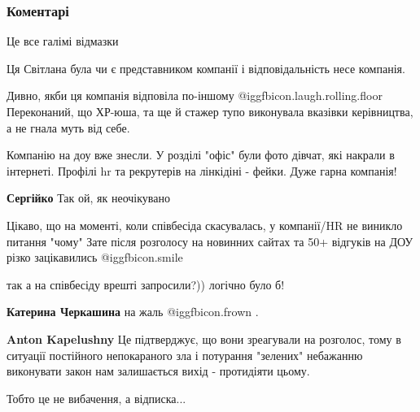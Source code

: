  
 
 
 
 
\subsubsection{Коментарі}
\label{sec:21_10_2021.fb.kapeljushnyj_anton.1.izvinenie_svetlana.cmt}

\begin{itemize} %
Це все галімі відмазки

Ця Світлана була чи є представником компанії і відповідальність несе компанія.

Дивно, якби ця компанія відповіла по-іншому  @igg{fbicon.laugh.rolling.floor}  Переконаний, що ХР-юша, та ще й стажер тупо виконувала вказівки керівництва, а не гнала муть від себе.

Компанію на доу вже знесли. У розділі "офіс" були фото дівчат, які накрали в інтернеті. Профілі hr та рекрутерів на лінкідіні - фейки.
Дуже гарна компанія!

\begin{itemize} %
\textbf{Сергійко} Так ой, як неочікувано
\end{itemize} %

Цікаво, що на моменті, коли співбесіда скасувалась, у компанії/HR не виникло питання "чому"
Зате після розголосу на новинних сайтах та 50+ відгуків на ДОУ різко зацікавились  @igg{fbicon.smile} 

так а на співбесіду врешті запросили?)) логічно було б!

\begin{itemize} %
\textbf{Катерина Черкашина} на жаль  @igg{fbicon.frown} .

\textbf{Anton Kapelushny} Це підтверджує, що вони зреагували на розголос, тому в ситуації постійного непокараного зла і потурання "зелених" небажанню виконувати закон нам залишається вихід - протидіяти цьому.

Тобто це не вибачення, а відписка...


\end{itemize}
\end{itemize}
